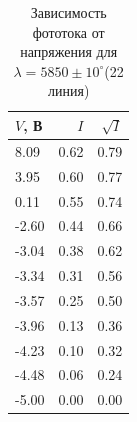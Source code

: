 \documentclass[12pt]{kiarticle} %
\begin{document}
    \begin{table}[htbp]
        \begin{center}
        \caption{Зависимость фототока от напряжения для $ \lambda = 5850\pm10^\circ $(22 линия)}
        \begin{tabular}{|l|r|r|}
            \hline
            $ V $, В & $ I $ & $ \sqrt{I}  $ \\
            \hline
            8.09 & 0.62 & 0.79 \\
            3.95 & 0.60 & 0.77 \\
            0.11 & 0.55 & 0.74 \\
            -2.60 & 0.44 & 0.66 \\
            -3.04 & 0.38 & 0.62 \\
            -3.34 & 0.31 & 0.56 \\
            -3.57 & 0.25 & 0.50 \\
            -3.96 & 0.13 & 0.36 \\
            -4.23 & 0.10 & 0.32 \\
            -4.48 & 0.06 & 0.24 \\
            -5.00 & 0.00 & 0.00 \\
            \hline
        \end{tabular}
        \label{}
        \end{center}
    \end{table}
        
        
\end{document}
